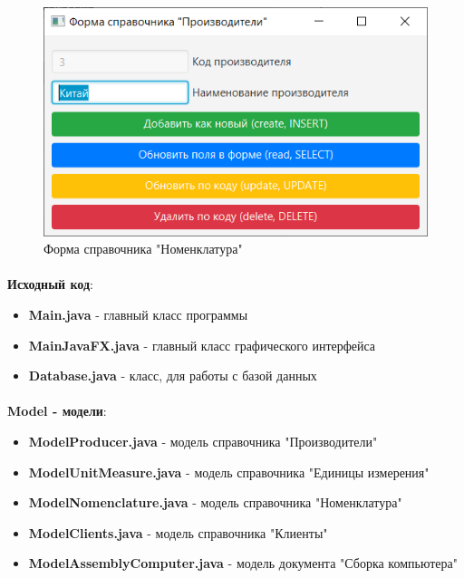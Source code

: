 \documentclass[12pt, a4paper, simple]{eskdtext}
\begin{document}
    \begin{figure}[!ph]
        \centering
        \includegraphics[]
            {_assets/View-Form-Producer.png}
        \caption{Форма справочника "Номенклатура"}
        \label{fig:View-Form-Producer}
    \end{figure}

    \newpage
    \paragraph{} \textbf{Исходный код}: 

    \begin{itemize}
        \item \textbf{Main.java} - главный класс программы
        \item \textbf{MainJavaFX.java} - главный класс графического интерфейса
        \item \textbf{Database.java} - класс, для работы с базой данных
    \end{itemize}

    \paragraph{} \textbf{Model - модели}:

    \begin{itemize}
        \item \textbf{ModelProducer.java} - модель справочника "Производители"
        \item \textbf{ModelUnitMeasure.java} - модель справочника "Единицы измерения"
        \item \textbf{ModelNomenclature.java} - модель справочника "Номенклатура"
        \item \textbf{ModelClients.java} - модель справочника "Клиенты"
        \item \textbf{ModelAssemblyComputer.java} - модель документа "Сборка компьютера"
    \end{itemize}
\end{document}
